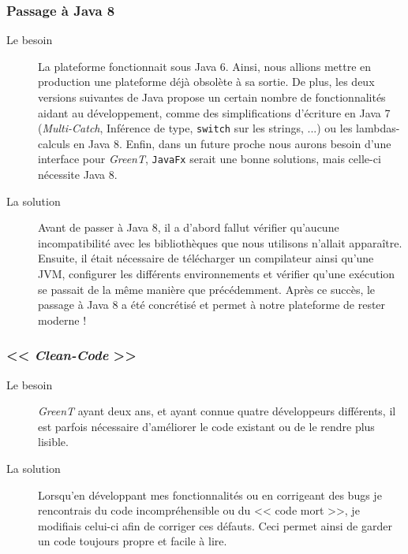 	\subsubsection{Passage à Java 8}
		\begin{description}
			\item[Le besoin] La plateforme fonctionnait sous Java 6. Ainsi, nous allions mettre en production une plateforme déjà obsolète à sa sortie. De plus, les deux versions suivantes de Java propose un certain nombre de fonctionnalités aidant au développement, comme des simplifications d'écriture en Java 7 (\textit{Multi-Catch}, Inférence de type, \texttt{switch} sur les strings, ...) ou les lambdas-calculs en Java 8. Enfin, dans un future proche nous aurons besoin d'une interface pour \textit{GreenT}, \texttt{JavaFx} serait une bonne solutions, mais celle-ci nécessite Java 8.
			\item[La solution] Avant de passer à Java 8, il a d'abord fallut vérifier qu'aucune incompatibilité avec les bibliothèques que nous utilisons n'allait apparaître. Ensuite, il était nécessaire de télécharger un compilateur ainsi qu'une JVM, configurer les différents environnements et vérifier qu'une exécution se passait de la même manière que précédemment. Après ce succès, le passage à Java 8 a été concrétisé et permet à notre plateforme de rester moderne ! 
		\end{description}
		
	\subsubsection{<< \textit{Clean-Code} >>}
		\begin{description}
			\item[Le besoin] \textit{GreenT} ayant deux ans, et ayant connue quatre développeurs différents, il est parfois nécessaire d'améliorer le code existant ou de le rendre plus lisible. 
			\item[La solution] Lorsqu'en développant mes fonctionnalités ou en corrigeant des bugs je rencontrais du code incompréhensible ou du << code mort >>, je modifiais celui-ci afin de corriger ces défauts. Ceci permet ainsi de garder un code toujours propre et facile à lire.
		\end{description}
		

